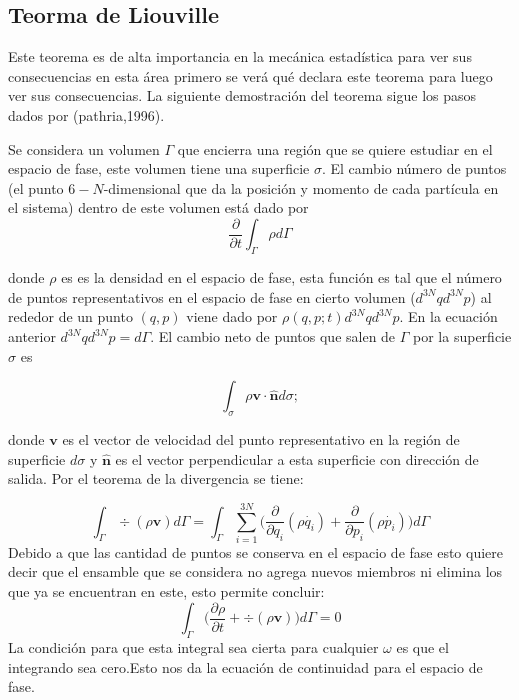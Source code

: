 \subsection{Teorma de Liouville }
Este teorema es de alta importancia en la mecánica estadística para ver sus consecuencias en esta área primero se verá qué declara este teorema para luego ver sus consecuencias. La siguiente demostración del teorema sigue los pasos dados por (pathria,1996). 

Se considera un volumen $\Gamma$ que encierra una región que se quiere estudiar en el espacio de fase,  este volumen tiene una superficie $\sigma$. El cambio número de puntos (el punto $6-N$-dimensional que da la posición y momento de cada partícula en el sistema) dentro de este volumen está dado por 
\begin{equation}
\frac{\partial}{\partial t} \int_{\Gamma} \rho d\Gamma
\end{equation}

donde $\rho$ es es la densidad en el espacio de fase, esta función es tal que el número de puntos representativos en el espacio de fase en cierto volumen ($d^{3N}q d^{3N}p$) al rededor de un punto $(q,p)$  viene dado por $\rho(q,p;t)d^{3N}q d^{3N}p$. En la ecuación anterior $d^{3N}q d^{3N}p=d\Gamma$. 
El cambio neto de puntos que salen de $\Gamma$ por la superficie $\sigma$ es

\begin{equation}
\int_{\sigma} \rho \mathbf{v \cdot \hat{n}} d\sigma;
\end{equation}

donde $\mathbf{v}$ es el vector de velocidad del punto representativo en la región de superficie $d\sigma$ y $\mathbf{\hat{n}}$ es el vector perpendicular a esta superficie con dirección de salida. Por el teorema de la divergencia se tiene:

\begin{equation}
\int_{\Gamma} \div{ ( \rho\mathbf{v} ) } d\Gamma = \int_{\Gamma} \sum_{i=1}^{3N} \Big( \frac{\partial}{\partial q_{i}}(\rho \dot{q_{i}})+ \frac{\partial}{\partial p_{i}} (\rho \dot{p_{i}}) \Big) d\Gamma
\end{equation}
Debido a que las cantidad de puntos se conserva en el espacio de fase esto quiere decir que el ensamble que se considera no agrega nuevos miembros ni elimina los que ya se encuentran en este, esto permite concluir:
\begin{equation}
 \int_{\Gamma} \Big( \frac{\partial \rho}{\partial t} + \div{ ( \rho\mathbf{v} ) } \Big) d\Gamma =0
\end{equation}
La condición para que esta integral sea cierta para cualquier $\omega$ es que el integrando sea cero.Esto nos da la ecuación de continuidad para el espacio de fase.

